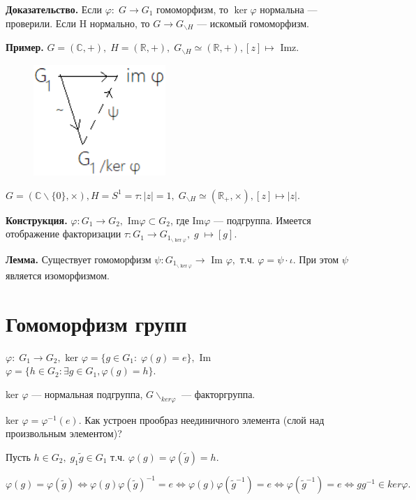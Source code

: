 \documentclass[12pt,a4paper]{article}
\begin{document}
\textbf{Доказательство.} Если $\varphi: \; G \to G_{1}$ гомоморфизм, то $\ker \varphi$ нормальна --- проверили. Если H нормально, то $G \to G_{\backslash H}$ --- искомый гомоморфизм. 

\textbf{Пример.} $G = (\mathbb{C}, +), \; H = (\mathbb{R}, +), \; G_{\backslash H} \simeq (\mathbb{R}, +), [z] \mapsto$ Imz.

\begin{figure}
	\includegraphics[width = 5cm]{constr.png}
\end{figure}

$G = (\mathbb{C} \backslash \{0\}, \times), H = S^{1} = {\tau: |z| = 1}, \; G_{\backslash H} \simeq (\mathbb{R}_{+}, \times), [z] \mapsto |z|.$

\textbf{Конструкция.} $\varphi: G_{1} \to G_{2},$ Im$\varphi \subset G_{2}$, где Im$\varphi$ --- подгруппа. Имеется отображение факторизации $\tau: G_{1} \to G_{1_{\backslash \ker \varphi}}, \; g \; \mapsto [g].$

\textbf{Лемма.} Существует гомоморфизм $\psi: G_{1_{\backslash \ker \varphi}} \to$ Im $\varphi,$ т.ч. $\varphi = \psi \cdot \iota.$ При этом $\psi$ является изоморфизмом. 
\section{Гомоморфизм групп} 

$\varphi: \; G_{1} \to G_{2},$ ker $\varphi = \{g \in G_{1}: \; \varphi(g) = e\},$ Im $\varphi = \{h \in G_{2}: \exists g \in G_{1}, \varphi(g) = h\}.$

ker $\varphi$ --- нормальная подгруппа, $G \backslash_{ker \varphi}$ --- факторгруппа. 

ker $\varphi = \varphi^{-1}(e).$ Как устроен прообраз неединичного элемента (слой над произвольным элементом)? 

Пусть $h \in G_{2}, \; g_{1}\widetilde{g} \in G_{1}$ т.ч. $\varphi(g) = \varphi(\widetilde{g}) = h.$ 

$\varphi(g) = \varphi(\widetilde{g}) \Leftrightarrow \varphi(g)\varphi(\widetilde{g})^{-1} = e \Leftrightarrow \varphi(g)\varphi(\widetilde{g}^{-1}) = e \Leftrightarrow \varphi(\widetilde{g}^{-1}) = e \Leftrightarrow gg^{-1} \in ker \varphi.$ 
\end{document}
